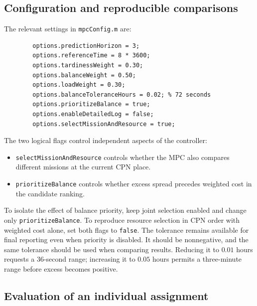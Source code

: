 \subsection{Configuration and reproducible comparisons}

The relevant settings in \texttt{mpcConfig.m} are:
\begin{small}
	\begin{verbatim}
		options.predictionHorizon = 3;
		options.referenceTime = 8 * 3600;
		options.tardinessWeight = 0.30;
		options.balanceWeight = 0.50;
		options.loadWeight = 0.30;
		options.balanceToleranceHours = 0.02; % 72 seconds
		options.prioritizeBalance = true;
		options.enableDetailedLog = false;
		options.selectMissionAndResource = true;
	\end{verbatim}
\end{small}
The two logical flags control independent aspects of the controller:
\begin{itemize}
	\item \texttt{selectMissionAndResource} controls whether the MPC also
	compares different missions at the current CPN place.
	\item \texttt{prioritizeBalance} controls whether excess spread precedes
	weighted cost in the candidate ranking.
\end{itemize}
To isolate the effect of balance priority, keep joint selection enabled and
change only \texttt{prioritizeBalance}. To reproduce resource selection in
CPN order with weighted cost alone, set both flags to \texttt{false}.
The tolerance remains available for final reporting even when priority is
disabled. It should be nonnegative, and the same tolerance should be used
when comparing results. Reducing it to $0.01$ hours requests a 36-second
range; increasing it to $0.05$ hours permits a three-minute range before
excess becomes positive.

\subsection{Evaluation of an individual assignment}

